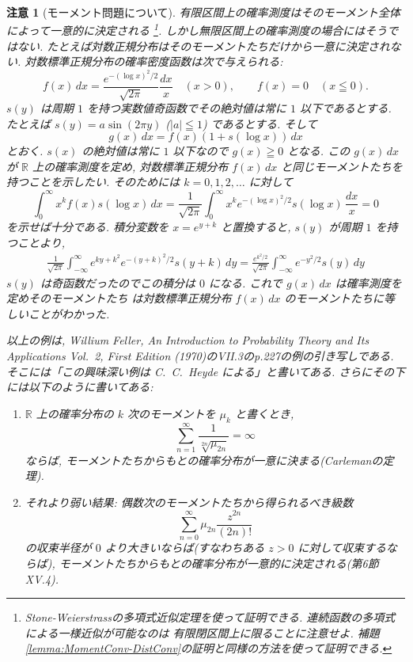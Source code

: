 \documentclass[12pt,twoside]{jarticle}
\newcommand\R{{\mathbb R}} %
\theoremstyle{jplain}
\theoremstyle{jplain}
\theoremstyle{jplain}
\newtheorem{remark}[theorem]{注意}
\numberwithin{theorem}{section}
\numberwithin{equation}{section}
\numberwithin{figure}{section}
\numberwithin{table}{section}
\newcommand\lemmaref[1]{補題\ref{#1}}
\begin{document}
\begin{remark}[モーメント問題について]
有限区間上の確率測度はそのモーメント全体によって一意的に決定される%
\footnote{Stone-Weierstrassの多項式近似定理を使って証明できる.
連続函数の多項式による一様近似が可能なのは
有限閉区間上に限ることに注意せよ.
\lemmaref{lemma:MomentConv-DistConv}の証明と同様の方法を使って証明できる.}.
しかし無限区間上の確率測度の場合にはそうではない.
たとえば対数正規分布はそのモーメントたちだけから一意に決定されない.
対数標準正規分布の確率密度函数は次で与えられる:
\[
f(x)\,dx = \frac{e^{-(\log x)^2/2}}{\sqrt{2\pi}}\frac{dx}{x} \quad (x>0),
\qquad f(x)=0 \quad (x\leqq 0).
\]
$s(y)$ は周期 $1$ を持つ実数値奇函数でその絶対値は常に $1$ 以下であるとする.
たとえば $s(y)=a\sin(2\pi y)$ ($|a|\leqq 1$) であるとする. そして
\[
g(x)\,dx=f(x)(1+s(\log x))\,dx
\]
とおく. $s(x)$ の絶対値は常に $1$ 以下なので $g(x)\geqq 0$ となる.
この $g(x)\,dx$ が $\R$ 上の確率測度を定め,
対数標準正規分布 $f(x)\,dx$ と同じモーメントたちを持つことを示したい.
そのためには $k=0,1,2,\ldots$ に対して
\[
\int_0^\infty x^k f(x)s(\log x)\,dx
= \frac{1}{\sqrt{2\pi}}\int_0^\infty
x^k e^{-(\log x)^2/2} s(\log x)\,\frac{dx}{x}
= 0
\]
を示せば十分である. 積分変数を $x=e^{y+k}$ と置換すると,
$s(y)$ が周期 $1$ を持つことより,
\begin{align*}
\frac{1}{\sqrt{2\pi}}\int_{-\infty}^\infty
e^{ky+k^2}e^{-(y+k)^2/2}s(y+k)\,dy
=
\frac{e^{k^2/2}}{\sqrt{2\pi}}
\int_{-\infty}^\infty e^{-y^2/2}s(y)\,dy
\end{align*}
$s(y)$ は奇函数だったのでこの積分は $0$ になる.
これで $g(x)\,dx$ は確率測度を定めそのモーメントたち
は対数標準正規分布 $f(x)\,dx$ のモーメントたちに等しいことがわかった.

以上の例は,
Willium Feller,
An Introduction to Probability Theory and Its Applications Vol.~2,
First Edition (1970)のVII.3のp.227の例の引き写しである.
そこには「この興味深い例は C.~C.~Heyde による」と書いてある.
さらにその下には以下のように書いてある:
\begin{enumerate}

\item[(1)] $\R$ 上の確率分布の $k$ 次のモーメントを $\mu_k$ と書くとき,
\[
\sum_{n=1}^\infty \frac{1}{\sqrt[2n]{\mu_{2n}}} = \infty
\]
ならば, モーメントたちからもとの確率分布が一意に決まる(Carlemanの定理).

\item[(2)] それより弱い結果: 偶数次のモーメントたちから得られるべき級数
\[
\sum_{n=0}^\infty \mu_{2n}\frac{z^{2n}}{(2n)!}
\]
の収束半径が $0$ より大きいならば(すなわちある $z>0$ に対して収束するならば),
モーメントたちからもとの確率分布が一意的に決定される(第6節XV.4).


\end{enumerate}
\end{remark}
\end{document}
